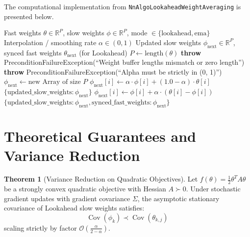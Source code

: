 \documentclass[11pt,a4paper]{article}
\theoremstyle{definition}
\newtheorem{theorem}{Theorem}[section]
\begin{document}
The computational implementation from \texttt{NnAlgoLookaheadWeightAveraging} is presented below.

\begin{algorithm}[H]
\caption{Lookahead / EMA Weight Averaging Synchronization Step}
\begin{algorithmic}[1]
\Require Fast weights $\theta \in \mathbb{R}^P$, slow weights $\phi \in \mathbb{R}^P$, mode $\in \{\text{lookahead}, \text{ema}\}$
\Require Interpolation / smoothing rate $\alpha \in (0, 1)$
\Ensure Updated slow weights $\phi_{\text{next}} \in \mathbb{R}^P$, synced fast weights $\theta_{\text{next}}$ (for Lookahead)
\State $P \gets \text{length}(\theta)$
    \State \textbf{throw} PreconditionFailureException(``Weight buffer lengths mismatch or zero length'')
\EndIf
{}
    \State \textbf{throw} PreconditionFailureException(``Alpha must be strictly in (0, 1)'')
\EndIf
\State $\phi_{\text{next}} \gets \text{new Array of size } P$
        \State $\phi_{\text{next}}[i] \gets \alpha \cdot \phi[i] + (1.0 - \alpha) \cdot \theta[i]$
    \EndFor
    \State \Return $\{\text{updated\_slow\_weights}: \phi_{\text{next}}\}$
\Else
        \State $\phi_{\text{next}}[i] \gets \phi[i] + \alpha \cdot (\theta[i] - \phi[i])$
    \EndFor
    \State \Return $\{\text{updated\_slow\_weights}: \phi_{\text{next}}, \text{synced\_fast\_weights}: \phi_{\text{next}}\}$
\EndIf
\end{algorithmic}
\end{algorithm}

\section{Theoretical Guarantees and Variance Reduction}

\begin{theorem}[Variance Reduction on Quadratic Objectives]
Let $f(\theta) = \frac{1}{2} \theta^T A \theta$ be a strongly convex quadratic objective with Hessian $A \succ 0$. Under stochastic gradient updates with gradient covariance $\Sigma$, the asymptotic stationary covariance of Lookahead slow weights satisfies:
\begin{equation}
\operatorname{Cov}(\phi_k) \prec \operatorname{Cov}(\theta_{k, j})
\end{equation}
scaling strictly by factor $\mathcal{O}\left(\frac{\alpha}{2 - \alpha}\right)$.
\end{theorem}
\end{document}

